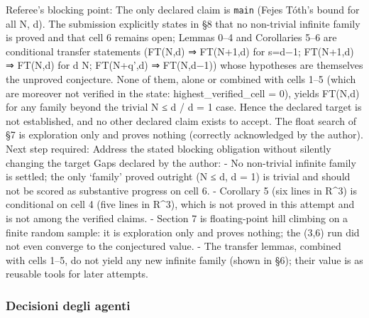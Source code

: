 \documentclass[11pt,a4paper]{article}
\begin{document}
Referee's blocking point: The only declared claim is \texttt{main}
(Fejes Tóth's bound for all N, d). The submission explicitly states in
§8 that no non-trivial infinite family is proved and that cell 6 remains
open; Lemmas 0--4 and Corollaries 5--6 are conditional transfer
statements (FT(N,d) ⇒ FT(N+1,d) for s=d−1; FT(N+1,d) ⇒ FT(N,d) for d
\textbar{} N; FT(N+q',d) ⇒ FT(N,d−1)) whose hypotheses are themselves
the unproved conjecture. None of them, alone or combined with cells 1--5
(which are moreover not verified in the state: highest\_verified\_cell =
0), yields FT(N,d) for any family beyond the trivial N ≤ d / d = 1 case.
Hence the declared target is not established, and no other declared
claim exists to accept. The float search of §7 is exploration only and
proves nothing (correctly acknowledged by the author). Next step
required: Address the stated blocking obligation without silently
changing the target Gaps declared by the author: - No non-trivial
infinite family is settled; the only `family' proved outright (N ≤ d, d
= 1) is trivial and should not be scored as substantive progress on cell
6. - Corollary 5 (six lines in R\^{}3) is conditional on cell 4 (five
lines in R\^{}3), which is not proved in this attempt and is not among
the verified claims. - Section 7 is floating-point hill climbing on a
finite random sample: it is exploration only and proves nothing; the
(3,6) run did not even converge to the conjectured value. - The transfer
lemmas, combined with cells 1--5, do not yield any new infinite family
(shown in §6); their value is as reusable tools for later attempts.

\subsubsection{Decisioni degli agenti}
\end{document}
